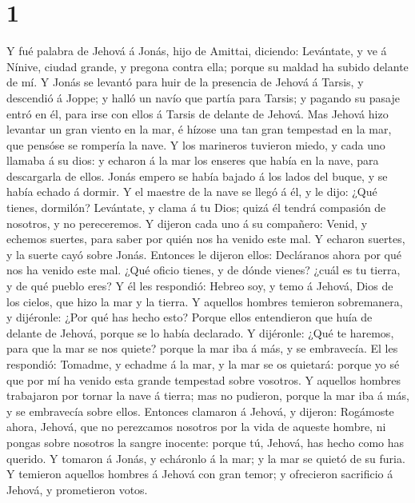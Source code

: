 \hypertarget{section}{%
\section{1}\label{section}}

 Y fué palabra de Jehová á Jonás, hijo de Amittai, diciendo:
 Levántate, y ve á Nínive, ciudad grande, y pregona contra
ella; porque su maldad ha subido delante de mí.  Y Jonás se
levantó para huir de la presencia de Jehová á Tarsis, y descendió á
Joppe; y halló un navío que partía para Tarsis; y pagando su pasaje
entró en él, para irse con ellos á Tarsis de delante de Jehová.
 Mas Jehová hizo levantar un gran viento en la mar, é hízose
una tan gran tempestad en la mar, que pensóse se rompería la nave.
 Y los marineros tuvieron miedo, y cada uno llamaba á su
dios: y echaron á la mar los enseres que había en la nave, para
descargarla de ellos. Jonás empero se había bajado á los lados del
buque, y se había echado á dormir.  Y el maestre de la nave
se llegó á él, y le dijo: ¿Qué tienes, dormilón? Levántate, y clama á tu
Dios; quizá él tendrá compasión de nosotros, y no pereceremos.
 Y dijeron cada uno á su compañero: Venid, y echemos
suertes, para saber por quién nos ha venido este mal. Y echaron suertes,
y la suerte cayó sobre Jonás.  Entonces le dijeron ellos:
Decláranos ahora por qué nos ha venido este mal. ¿Qué oficio tienes, y
de dónde vienes? ¿cuál es tu tierra, y de qué pueblo eres? 
Y él les respondió: Hebreo soy, y temo á Jehová, Dios de los cielos, que
hizo la mar y la tierra.  Y aquellos hombres temieron
sobremanera, y dijéronle: ¿Por qué has hecho esto? Porque ellos
entendieron que huía de delante de Jehová, porque se lo había declarado.
 Y dijéronle: ¿Qué te haremos, para que la mar se nos
quiete? porque la mar iba á más, y se embravecía.  El les
respondió: Tomadme, y echadme á la mar, y la mar se os quietará: porque
yo sé que por mí ha venido esta grande tempestad sobre vosotros.
 Y aquellos hombres trabajaron por tornar la nave á tierra;
mas no pudieron, porque la mar iba á más, y se embravecía sobre ellos.
 Entonces clamaron á Jehová, y dijeron: Rogámoste ahora,
Jehová, que no perezcamos nosotros por la vida de aqueste hombre, ni
pongas sobre nosotros la sangre inocente: porque tú, Jehová, has hecho
como has querido.  Y tomaron á Jonás, y echáronlo á la mar;
y la mar se quietó de su furia.  Y temieron aquellos
hombres á Jehová con gran temor; y ofrecieron sacrificio á Jehová, y
prometieron votos. 

